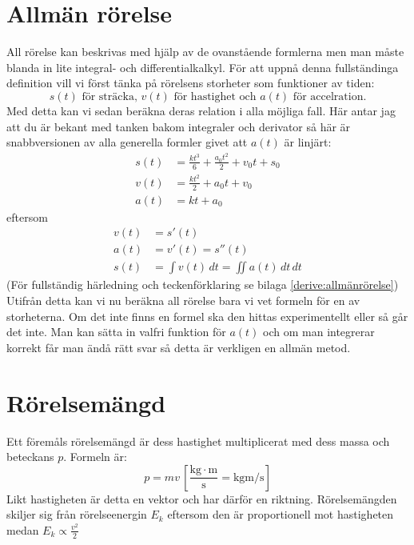 \section{Allmän rörelse}
All rörelse kan beskrivas med hjälp av de ovanstående formlerna men man måste blanda in lite integral- och differentialkalkyl. För att uppnå denna fullständinga definition vill vi först tänka på rörelsens storheter som funktioner av tiden:
\begin{equation*}
    s(t) \text{ för sträcka, } v(t) \text{ för hastighet och } a(t) \text{ för accelration.}
\end{equation*}
Med detta kan vi sedan beräkna deras relation i alla möjliga fall. Här antar jag att du är bekant med tanken bakom integraler och derivator så här är snabbversionen av alla generella formler givet att $a(t)$ är linjärt:
\begin{align*}
    s(t) &= \frac{kt^3}{6} + \frac{a_0t^2}{2} + v_0t + s_0 \\
    v(t) &= \frac{kt^2}{2} + a_0t + v_0 \\
    a(t) &= kt + a_0
\end{align*}
eftersom
\begin{align*}
    v(t) &= s'(t) \\
    a(t) &= v'(t) = s''(t) \\
    s(t) &= \int{v(t)}\, dt = \iint{a(t)}\, dt\, dt
\end{align*}
(För fullständig härledning och teckenförklaring se bilaga \ref{derive:allmänrörelse}) Utifrån detta kan vi nu beräkna all rörelse bara vi vet formeln för en av storheterna. Om det inte finns en formel ska den hittas experimentellt eller så går det inte. Man kan sätta in valfri funktion för $a(t)$ och om man integrerar korrekt får man ändå rätt svar så detta är verkligen en allmän metod.

\section{Rörelsemängd}
Ett föremåls rörelsemängd är dess hastighet multiplicerat med dess massa och beteckans $p$. Formeln är: \[ p = mv\, \left[\mathrm{\frac{kg \cdot m}{s}  = kgm/s}\right] \] Likt hastigheten är detta en vektor och har därför en riktning. Rörelsemängden skiljer sig från rörelseenergin $E_k$ eftersom den är proportionell mot hastigheten medan $E_k \propto \frac{v^2}{2}$